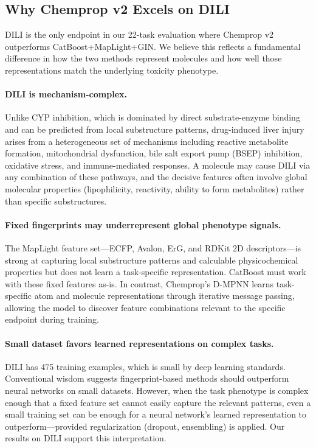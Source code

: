 \documentclass[11pt]{article}
\begin{document}
\subsection{Why Chemprop v2 Excels on DILI}
\label{sec:dili_discussion}

DILI is the only endpoint in our 22-task evaluation where Chemprop v2 outperforms CatBoost+MapLight+GIN. We believe this reflects a fundamental difference in how the two methods represent molecules and how well those representations match the underlying toxicity phenotype.

\paragraph{DILI is mechanism-complex.} Unlike CYP inhibition, which is dominated by direct substrate-enzyme binding and can be predicted from local substructure patterns, drug-induced liver injury arises from a heterogeneous set of mechanisms including reactive metabolite formation, mitochondrial dysfunction, bile salt export pump (BSEP) inhibition, oxidative stress, and immune-mediated responses. A molecule may cause DILI via any combination of these pathways, and the decisive features often involve global molecular properties (lipophilicity, reactivity, ability to form metabolites) rather than specific substructures.

\paragraph{Fixed fingerprints may underrepresent global phenotype signals.} The MapLight feature set---ECFP, Avalon, ErG, and RDKit 2D descriptors---is strong at capturing local substructure patterns and calculable physicochemical properties but does not learn a task-specific representation. CatBoost must work with these fixed features as-is. In contrast, Chemprop's D-MPNN learns task-specific atom and molecule representations through iterative message passing, allowing the model to discover feature combinations relevant to the specific endpoint during training.

\paragraph{Small dataset favors learned representations on complex tasks.} DILI has 475 training examples, which is small by deep learning standards. Conventional wisdom suggests fingerprint-based methods should outperform neural networks on small datasets. However, when the task phenotype is complex enough that a fixed feature set cannot easily capture the relevant patterns, even a small training set can be enough for a neural network's learned representation to outperform---provided regularization (dropout, ensembling) is applied. Our results on DILI support this interpretation.
\end{document}
